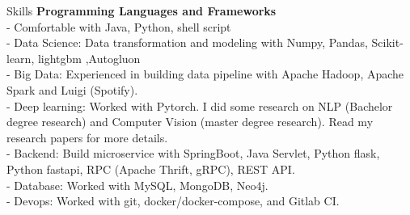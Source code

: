\documentclass{resume} %
\begin{document}






\begin{rSection}{Skills}
{\bf Programming Languages and Frameworks }
\\ - Comfortable with Java, Python, shell script
\\ - Data Science: Data transformation and modeling with Numpy, Pandas, Scikit-learn, lightgbm ,Autogluon
\\ - Big Data: Experienced in building data pipeline with Apache Hadoop, Apache Spark and Luigi (Spotify).
\\ - Deep learning: Worked with Pytorch. I did some research on NLP (Bachelor degree research) and Computer Vision (master degree research). Read my research papers for more details.
\\ - Backend: Build microservice with SpringBoot, Java Servlet, Python flask, Python fastapi, RPC (Apache Thrift, gRPC), REST API. 
\\ - Database: Worked with MySQL, MongoDB, Neo4j. 
\\ - Devops: Worked with git, docker/docker-compose, and Gitlab CI. 
\end{rSection}
\end{document}

